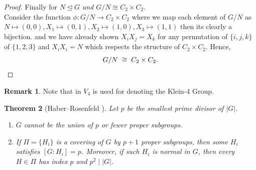 \documentclass[12pt, a4paper]{article}
\theoremstyle{plain}
\newtheorem{theorem}{Theorem}[section]
\theoremstyle{definition}
\newtheorem{remark}[theorem]{Remark}
\begin{document}
\begin{proof}
\medskip
\noindent Finally for \textit{ $N \trianglelefteq G$ and $G/N \cong C_2\times C_2$.} \\
Consider the function $\phi : G/N \to C_2 \times C_2$ 
where we map each element of $G/N$ as \\ 
$N \mapsto (0,0), X_1 \mapsto (0,1), X_2 \mapsto (1,0), X_3 \mapsto (1,1)$ then its clearly a bijection.
and we have already shown $X_iX_j = X_k$ for any permutation of $\{i,j,k\}$ of $\{1,2,3\}$ and  $X_iX_i = N$ which respects the structure of $C_2 \times C_2$. Hence,
\[
  G/N \;\cong\; C_2\times C_2. \qedhere
\]
\end{proof}
\begin{remark}
  Note that in \cite{velasquez2022} $V_4$ is used for denoting the Klein-4 Group.
\end{remark}
\begin{theorem}[Haber--Rosenfeld {\cite[Theorem~4]{velasquez2022}}]
  \label{thm:hr}
  Let $p$ be the smallest prime divisor of $|G|$.
  \begin{enumerate}[label=\emph{(\roman*)}]
    \item $G$ cannot be the union of $p$ or fewer proper subgroups.
    \item If $\Pi = \{H_i\}$ is a covering of $G$ by $p+1$ proper subgroups, then
      some $H_i$ satisfies $[G : H_i] = p$. Moreover, if such $H_i$ is normal in $G$,
      then every $H \in \Pi$ has index $p$ and $p^2 \mid |G|$.
  \end{enumerate}
\end{theorem}
\end{document}
